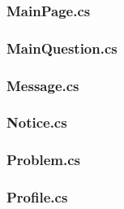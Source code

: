 \documentclass{../includes/TechDoc}
\begin{document}
    \subsubsection{MainPage.cs}
    

    \subsubsection{MainQuestion.cs}
    

    \subsubsection{Message.cs}
    

    \subsubsection{Notice.cs}
    

    \subsubsection{Problem.cs}
    

    \subsubsection{Profile.cs}
    


    \registrationList
\end{document}
